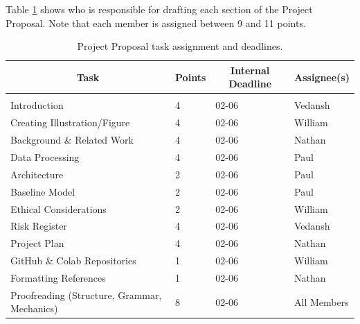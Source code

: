 \documentclass{article} %
\begin{document}
Table \ref{project_proposal_table} shows who is responsible for drafting each section of the Project Proposal. Note that each member is assigned between 9 and 11 points.

    \begin{table}[t]
    \caption{Project Proposal task assignment and deadlines.}
    \label{project_proposal_table}
    \begin{center}
    \begin{tabular}{llll}
    \multicolumn{1}{c}{\bf Task}                    & \multicolumn{1}{c}{\bf Points} & \multicolumn{1}{c}{\bf Internal Deadline} & \multicolumn{1}{c}{\bf Assignee(s)}
    \\ \hline \\
    Introduction                                    & 4                              & 02-06                                     & Vedansh \\
    Creating Illustration/Figure                    & 4                              & 02-06                                     & William \\
    Background \& Related Work                      & 4                              & 02-06                                     & Nathan \\
    Data Processing                                 & 4                              & 02-06                                     & Paul \\
    Architecture                                    & 2                              & 02-06                                     & Paul \\
    Baseline Model                                  & 2                              & 02-06                                     & Paul \\
    Ethical Considerations                          & 2                              & 02-06                                     & William \\
    Risk Register                                   & 4                              & 02-06                                     & Vedansh \\
    Project Plan                                    & 4                              & 02-06                                     & Nathan \\
    GitHub \& Colab Repositories                    & 1                              & 02-06                                     & William \\
    Formatting References                           & 1                              & 02-06                                     & Nathan \\
    Proofreading (Structure, Grammar, Mechanics)    & 8                              & 02-06                                     & All Members \\
    \end{tabular}
    \end{center}
    \end{table}
\end{document}
